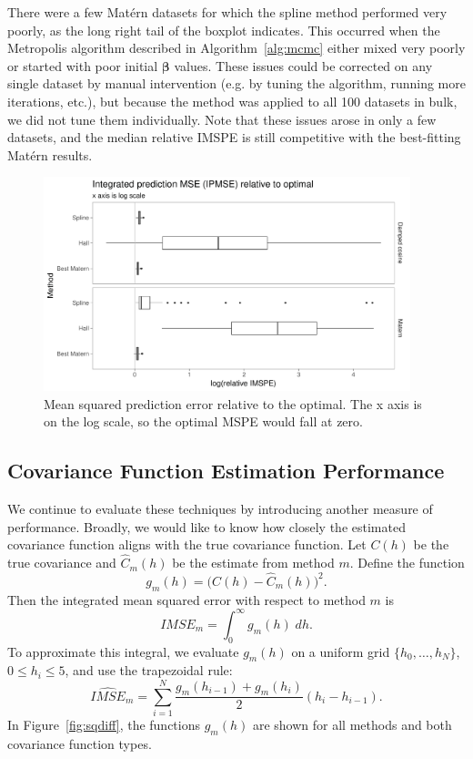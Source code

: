 \documentclass[12pt]{article}
\begin{document}
There were a few Mat\'{e}rn datasets for which the spline method performed very poorly, as the long right tail of the boxplot indicates. This occurred when the Metropolis algorithm described in Algorithm~\ref{alg:mcmc} either mixed very poorly or started with poor initial $\bm{\beta}$ values. These issues could be corrected on any single dataset by manual intervention (e.g. by tuning the algorithm, running more iterations, etc.), but because the method was applied to all 100 datasets in bulk, we did not tune them individually. Note that these issues arose in only a few datasets, and the median relative IMSPE is still competitive with the best-fitting Mat\'{e}rn results.

\begin{figure}[htbp]
  \centering
  \includegraphics[width=0.95\textwidth]{pred_log.pdf}
  \caption{Mean squared prediction error relative to the optimal. The x axis is on the log scale, so the optimal MSPE would fall at zero.}
  \label{fig:pred-log}
\end{figure}

\subsection{Covariance Function Estimation Performance} %
\label{sec:covariance_function_estimation_performance}

We continue to evaluate these techniques by introducing another measure of performance. Broadly, we would like to know how closely the estimated covariance function aligns with the true covariance function. Let $C(h)$ be the true covariance and $\widehat{C}_m(h)$ be the estimate from method $m$. Define the function
\[
  g_m(h) = \big(C(h) - \widehat{C}_m(h) \big)^2.
\]
Then the integrated mean squared error with respect to method $m$ is
\[
  IMSE_m = \int_0^\infty g_m(h) \; dh.
\]
To approximate this integral, we evaluate $g_m(h)$ on a uniform grid $\{h_0, \dots, h_N\}$, $0 \leq h_i \leq 5$, and use the trapezoidal rule:
\[
  \widehat{IMSE}_m = \sum_{i=1}^N \frac{g_m(h_{i-1}) + g_m(h_i)}{2} (h_i - h_{i-1}).
\]
In Figure~\ref{fig:sqdiff}, the functions $g_m(h)$ are shown for all methods and both covariance function types.
\end{document}

